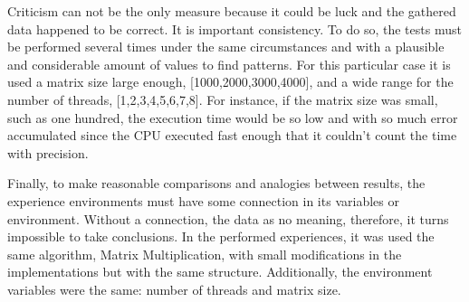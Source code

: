 Criticism can not be the only measure because it could be luck and the gathered data happened to be correct. It is important consistency. To do so, the tests must be performed several times under the same circumstances and with a plausible and  considerable amount of values to find patterns. For this particular case  it is used a matrix size large enough, [1000,2000,3000,4000], and a wide range for the number of threads, [1,2,3,4,5,6,7,8]. For instance, if the matrix size was small, such as one hundred, the execution time would be so low and with so much error accumulated since the CPU executed fast enough that it couldn't count the time with precision. 

Finally, to make reasonable comparisons and analogies between results, the experience environments must have some connection in its variables or environment. Without a connection, the data as no meaning, therefore, it turns impossible to take conclusions. In the performed experiences, it was used the same algorithm, Matrix Multiplication, with small modifications in the implementations but with the same structure. Additionally, the environment variables were the same: number of threads and matrix size.

  

